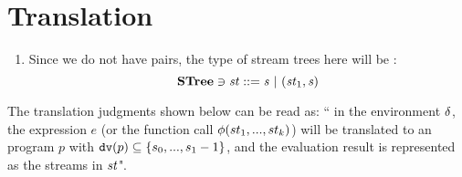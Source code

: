 \section{Translation}

\begin{enumerate}[(1)]
	\item Since we do not have pairs, the type of stream trees here will be : $$ \STree \ni \st ::= \s \ | \ (\st_1,\s) $$

%	

\end{enumerate}
	
The translation judgments shown below can be read as: `` in the environment $\delta$, the expression $e$ (or the function call $\phi(st_1,...,st_k)$) will be translated to an \fmsvcode program $p$ with $\mathtt{dv}(p) \subseteq \{s_0,...,s_1 -1\}$, and the evaluation result is represented as the streams in $\mathit{st}$". 
	
